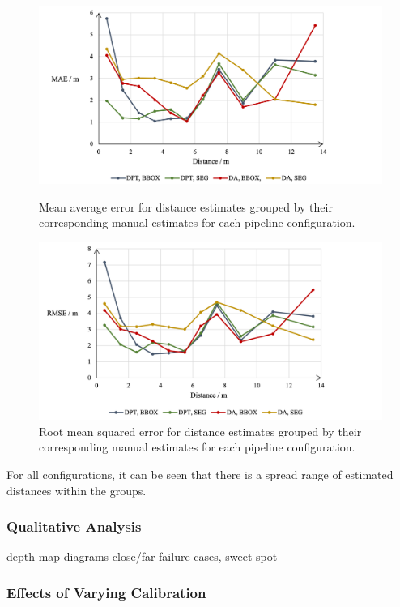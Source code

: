 \begin{figure}[H]
    \vspace{1cm}
    \centering
    \includegraphics[width=1.01\textwidth]{body/analysis/assets/errors/MAE}
    \caption{Mean average error for distance estimates grouped by their corresponding manual
    estimates for each pipeline configuration.}
    \label{fig:mae}

    \vspace{2cm}

    \includegraphics[width=1.01\textwidth]{body/analysis/assets/errors/RMSE}
    \caption{Root mean squared error for distance estimates grouped by their corresponding manual
    estimates for each pipeline configuration.}
    \label{fig:rmse}
\end{figure}

\clearpage

For all configurations, it can be seen that there is a spread range of estimated distances
within the groups.

\clearpage

\subsubsection{Qualitative Analysis}
depth map diagrams
close/far failure cases, sweet spot

\subsubsection{Effects of Varying Calibration}